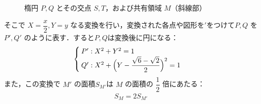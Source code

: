 \documentclass[../../main.tex]{subfiles}
\begin{document}
\begin{figure}[htb]
  \caption{楕円 $P, Q$ とその交点 $S, T$，および共有領域 $M$（斜線部）}
  \label{fig:ellipses_region_M}
\end{figure}

そこで $X = \dfrac{x}{2}, Y = y$ なる変換を行い，変換された各点や図形を$'$をつけて$P, Q$ を $P', Q'$ のように表す．すると$P,Q$は変換後に円になる：
\begin{align}
  \begin{cases}
    P' : X^2 + Y^2 = 1 \\
    Q' : X^2 + \Bigl(Y - \dfrac{\sqrt{6}-\sqrt{2}}{2}\Bigr)^2 = 1
  \end{cases} \label{eq:1}
\end{align}
また，この変換で $M'$ の面積$S_{M'}$は $M$ の面積の $\dfrac{1}{2}$ 倍にあたる：
\begin{align}
  S_{M} = 2S_{M'} \label{eq:2}
\end{align}
\end{document}
